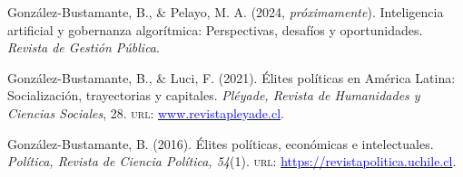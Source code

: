





\begin{publications}

\begin{benumerate}{3}

\item{González-Bustamante, B., \& Pelayo, M. A. (2024, {\itshape próximamente}). Inteligencia artificial y gobernanza algorítmica: Perspectivas, desafíos y oportunidades. {\itshape Revista de Gestión Pública}.}\vspace{1mm}

\item{González-Bustamante, B., \& Luci, F. (2021). Élites políticas en América Latina: Socialización, trayectorias y capitales. {\itshape Pléyade, Revista de Humanidades y Ciencias Sociales}, 28. {\scshape url:} \href{http://www.revistapleyade.cl/index.php/OJS/issue/view/30}{\textcolor{blue}{www.revistapleyade.cl}}.}\vspace{1mm}

\item{González-Bustamante, B. (2016). Élites políticas, económicas e intelectuales. {\itshape Política, Revista de Ciencia Política, 54}(1). {\scshape url:} \href{https://revistapolitica.uchile.cl/index.php/RP/issue/view/4365}{\textcolor{blue}{https://revistapolitica.uchile.cl}}.}\vspace{1mm}

\end{benumerate}

\end{publications}
